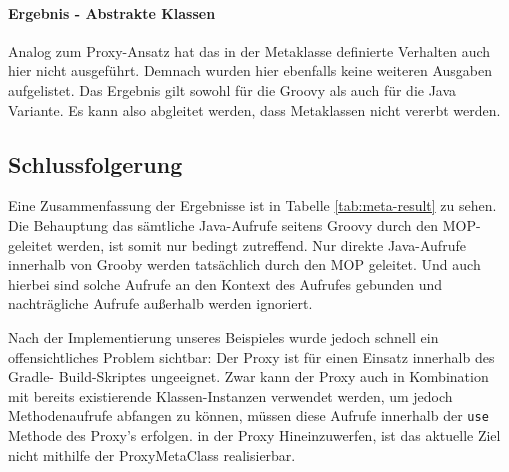 \paragraph{Ergebnis - Abstrakte Klassen}
Analog zum Proxy-Ansatz hat das in der Metaklasse definierte Verhalten auch hier nicht ausgeführt.
Demnach wurden hier ebenfalls keine weiteren Ausgaben aufgelistet.
Das Ergebnis gilt sowohl für die Groovy als auch für die Java Variante.
Es kann also abgleitet werden, dass Metaklassen nicht vererbt werden.








%
\pagebreak
\subsection{Schlussfolgerung}

Eine Zusammenfassung der Ergebnisse ist in Tabelle \ref{tab:meta-result} zu sehen.
Die Behauptung das sämtliche Java-Aufrufe seitens Groovy durch den MOP-geleitet werden, ist somit nur bedingt zutreffend.
Nur direkte Java-Aufrufe innerhalb von Grooby werden tatsächlich durch den MOP geleitet.
Und auch hierbei sind solche Aufrufe an den Kontext des Aufrufes gebunden und nachträgliche Aufrufe außerhalb werden ignoriert.

Nach der Implementierung unseres Beispieles wurde jedoch schnell ein offensichtliches
Problem sichtbar: Der Proxy ist für einen Einsatz innerhalb des Gradle-
Build-Skriptes ungeeignet. 
Zwar kann der Proxy auch in Kombination mit bereits existierende
Klassen-Instanzen verwendet werden, um jedoch Methodenaufrufe abfangen
zu können, müssen diese Aufrufe innerhalb der \texttt{use} Methode des Proxy's erfolgen.
in der Proxy Hineinzuwerfen, ist das aktuelle Ziel nicht mithilfe der ProxyMetaClass realisierbar.

